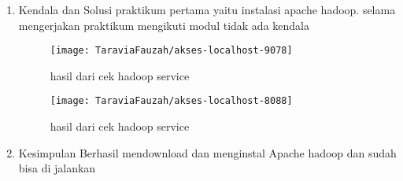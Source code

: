 
\begin{enumerate}
\item Kendala dan Solusi
\newline praktikum pertama yaitu instalasi apache hadoop. selama mengerjakan praktikum mengikuti modul tidak ada kendala

\begin{figure}[!ht]
\texttt{[image: TaraviaFauzah/akses-localhost-9078]}
\caption{hasil dari cek hadoop service}
\label{gam:perkuliahan15-9}
\end{figure}

\begin{figure}[!ht]
\texttt{[image: TaraviaFauzah/akses-localhost-8088]}
\caption{hasil dari cek hadoop service}
\label{gam:perkuliahan15-9}
\end{figure}

\item Kesimpulan
\newline Berhasil mendownload dan menginstal Apache hadoop dan sudah bisa di jalankan 
\end{enumerate}

